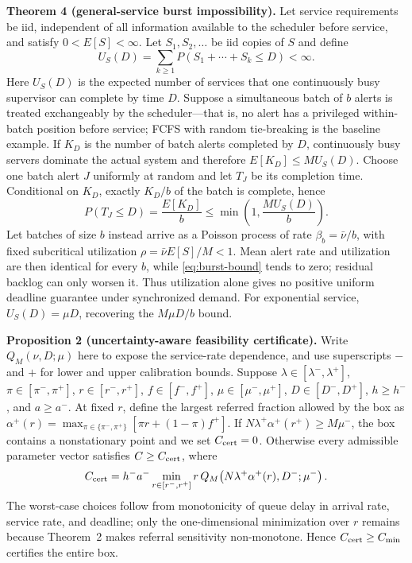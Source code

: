\documentclass[letterpaper,10pt,conference]{ieeeconf}
\begin{document}
\textbf{Theorem 4 (general-service burst impossibility).}
Let service requirements be iid, independent of all information available to
the scheduler before service, and satisfy $0<E[S]<\infty$. Let
$S_1,S_2,\ldots$ be iid copies of $S$ and define
\begin{equation}
U_S(D)=\sum_{k\ge1}P(S_1+\cdots+S_k\le D)<\infty.
\end{equation}
Here \(U_S(D)\) is the expected number of services that one continuously busy
supervisor can complete by time \(D\). Suppose a simultaneous batch of \(b\)
alerts is treated exchangeably by the scheduler---that is, no alert has a
privileged within-batch position before service; FCFS with random tie-breaking
is the baseline example. If $K_D$ is the number of batch alerts completed by
$D$, continuously busy servers dominate the actual system and therefore
$E[K_D]\le M U_S(D)$. Choose one batch alert \(J\) uniformly at random and
let $T_J$ be its completion time. Conditional on \(K_D\), exactly \(K_D/b\)
of the batch is complete, hence
\begin{equation}
P(T_J\le D)=\frac{E[K_D]}{b}
\le \min\left(1,\frac{M U_S(D)}{b}\right).
\label{eq:burst-bound}
\end{equation}
Let batches of size \(b\) instead arrive as a Poisson process of rate
\(\beta_b=\bar\nu/b\), with fixed subcritical utilization
\(\rho=\bar\nu E[S]/M<1\). Mean alert rate and utilization are then identical
for every \(b\), while \eqref{eq:burst-bound} tends to zero; residual backlog
can only worsen it. Thus utilization alone gives no positive uniform deadline
guarantee under synchronized demand. For exponential service,
\(U_S(D)=\mu D\), recovering the \(M\mu D/b\) bound.

\textbf{Proposition 2 (uncertainty-aware feasibility certificate).}
Write $Q_M(\nu,D;\mu)$ here to expose the service-rate dependence, and use
superscripts \(-\) and \(+\) for lower and upper calibration bounds. Suppose
$\lambda\in[\lambda^-,\lambda^+]$,
$\pi\in[\pi^-,\pi^+]$, $r\in[r^-,r^+]$, $f\in[f^-,f^+]$,
$\mu\in[\mu^-,\mu^+]$, $D\in[D^-,D^+]$, $h\ge h^-$, and $a\ge a^-$.
At fixed \(r\), define the largest referred fraction allowed by the box as
\(\alpha^+(r)=\max_{\pi\in\{\pi^-,\pi^+\}}
[\pi r+(1-\pi)f^+]\). If
$N\lambda^+\alpha^+(r^+)\ge M\mu^-$, the box contains a nonstationary point
and we set $C_{\rm cert}=0$. Otherwise every admissible parameter vector
satisfies $C\ge C_{\rm cert}$, where
\begin{equation}
C_{\rm cert}=h^-a^-\min_{r\in[r^-,r^+]}
r\,Q_M\!\left(N\lambda^+\alpha^+(r),D^-;\mu^-\right).
\label{eq:robust-cert}
\end{equation}
The worst-case choices follow from monotonicity of queue delay in arrival rate,
service rate, and deadline; only the one-dimensional minimization over \(r\)
remains because Theorem~2 makes referral sensitivity non-monotone. Hence
\(C_{\rm cert}\ge C_{\min}\) certifies the entire box.
\end{document}
